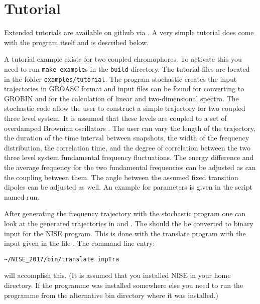 \chapter{Tutorial}
Extended tutorials are available on github via . A very simple tutorial does come with the program itself and is described below.  

A tutorial example exists for two coupled chromophores. To activate this you need to run {\tt make example}s in the {\tt build} directory. The tutorial files are located in the folder {\tt examples/tutorial}. The program stochastic creates the input 
trajectories in GROASC format and input files can be found for converting to GROBIN and for the
calculation of linear and two-dimensional spectra. The stochastic code allow the user to construct
a simple trajectory for two coupled three level system. It is assumed that these levels are coupled
to a set of overdamped Brownian oscillators \cite{Mukamel.1995.B01}.
The user can vary the length of the trajectory, the duration of the time interval between snapshots, the 
width of the frequency distribution, the correlation time, and the degree of correlation between the
two three level system fundamental frequency fluctuations. The energy difference and the average frequency for the two fundamental frequencies can be adjusted as can the coupling between them.
The angle between the assumed fixed transition dipoles can be adjusted as well. An example for
parameters is given in the script named run. 

After generating the frequency trajectory with the stochastic program one can look at the generated
trajectories in  and . The should the be converted to binary input for the NISE
program. This is done with the translate program with the input given in the file .
The command line entry:
\begin{lstlisting}[style=mystyle]
~/NISE_2017/bin/translate inpTra
\end{lstlisting}
will accomplish this. (It is assumed that you installed NISE in your home directory. If the programme was installed somewhere else you need to run the programme from the alternative bin directory where it was installed.)

